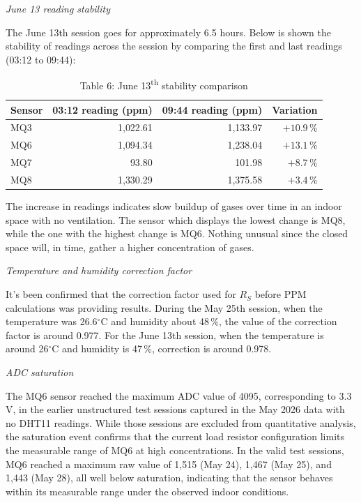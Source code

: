\textit{June 13 reading stability}

The June 13th session goes for approximately 6.5 hours. Below is shown the stability of
readings across the session by comparing the first and last readings (03:12 to 09:44):

\vspace{12pt}
\begin{table}[H]
  \centering
  \caption{Table 6: June 13\textsuperscript{th} stability comparison}
  \label{tab:stability}
  \renewcommand{\arraystretch}{1.3}
  \begin{tabular}{lrrr}
    \toprule
    \textbf{Sensor} & \textbf{03:12 reading (ppm)} & \textbf{09:44 reading (ppm)} & \textbf{Variation} \\
    \midrule
    MQ3 & 1{,}022.61 & 1{,}133.97 & $+10.9\,\%$ \\
    MQ6 & 1{,}094.34 & 1{,}238.04 & $+13.1\,\%$ \\
    MQ7 &     93.80  &    101.98  & $+8.7\,\%$  \\
    MQ8 & 1{,}330.29 & 1{,}375.58 & $+3.4\,\%$  \\
    \bottomrule
  \end{tabular}
\end{table}
\vspace{12pt}

The increase in readings indicates slow buildup of gases over time in an indoor space with no
ventilation. The sensor which displays the lowest change is MQ8, while the one with the
highest change is MQ6. Nothing unusual since the closed space will, in time, gather a higher
concentration of gases.

\textit{Temperature and humidity correction factor}

It's been confirmed that the correction factor used for $R_S$ before PPM calculations was
providing results. During the May 25th session, when the temperature was 26.6$^\circ$C and
humidity about 48\,\%, the value of the correction factor is around 0.977. For the June 13th
session, when the temperature is around 26$^\circ$C and humidity is 47\,\%, correction is
around 0.978.

\textit{ADC saturation}

The MQ6 sensor reached the maximum ADC value of 4095, corresponding to 3.3\,V, in the earlier
unstructured test sessions captured in the May 2026 data with no DHT11 readings. While those
sessions are excluded from quantitative analysis, the saturation event confirms that the
current load resistor configuration limits the measurable range of MQ6 at high concentrations.
In the valid test sessions, MQ6 reached a maximum raw value of 1{,}515 (May 24), 1{,}467
(May 25), and 1{,}443 (May 28), all well below saturation, indicating that the sensor behaves
within its measurable range under the observed indoor conditions.


